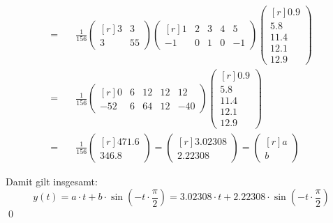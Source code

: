 \documentclass[answers]{exam}
\newcommand{\vektor}[1]{\begin{pmatrix*}[r] #1 \end{pmatrix*}}
\begin{document}
\begin{questions}
\begin{solution}
$$\begin{aligned}
                = \quad           & \frac{1}{156}\vektor{3        & 3                 \\ 3 & 55} \vektor{1 & 2 & 3 & 4 & 5 \\ -1 & 0 & 1 & 0 & -1} \vektor{0.9 \\ 5.8 \\ 11.4 \\ 12.1 \\ 12.9} \\
                = \quad           & \frac{1}{156}\vektor{0        & 6  & 12 & 12 & 12 \\ -52 & 6 & 64 & 12 & -40} \vektor{0.9 \\ 5.8 \\ 11.4 \\ 12.1 \\ 12.9} \\
                = \quad           & \frac{1}{156}\vektor{471.6                        \\ 346.8} = \vektor{3.02308 \\ 2.22308} = \vektor{a \\ b}
            \end{aligned}
        $$

        Damit gilt insgesamt:
        $$
            y(t) = a \cdot t + b \cdot \sin\left( -t \cdot \frac{\pi}{2} \right) = 3.02308 \cdot t + 2.22308 \cdot \sin\left( -t \cdot \frac{\pi}{2} \right)
        $$\qed

    \end{solution}
\end{questions}
\end{document}

